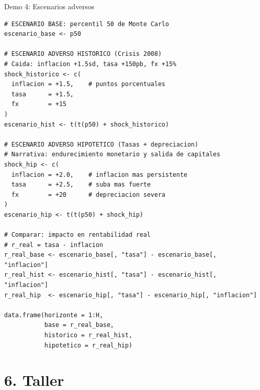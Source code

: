 \documentclass[10pt,aspectratio=169]{beamer}
\begin{document}
\begin{frame}[fragile]{Demo 4: Escenarios adversos}
\begin{lstlisting}
# ESCENARIO BASE: percentil 50 de Monte Carlo
escenario_base <- p50

# ESCENARIO ADVERSO HISTORICO (Crisis 2008)
# Caida: inflacion +1.5sd, tasa +150pb, fx +15%
shock_historico <- c(
  inflacion = +1.5,    # puntos porcentuales
  tasa      = +1.5,
  fx        = +15
)
escenario_hist <- t(t(p50) + shock_historico)

# ESCENARIO ADVERSO HIPOTETICO (Tasas + depreciacion)
# Narrativa: endurecimiento monetario y salida de capitales
shock_hip <- c(
  inflacion = +2.0,    # inflacion mas persistente
  tasa      = +2.5,    # suba mas fuerte
  fx        = +20      # depreciacion severa
)
escenario_hip <- t(t(p50) + shock_hip)

# Comparar: impacto en rentabilidad real
# r_real = tasa - inflacion
r_real_base <- escenario_base[, "tasa"] - escenario_base[, "inflacion"]
r_real_hist <- escenario_hist[, "tasa"] - escenario_hist[, "inflacion"]
r_real_hip  <- escenario_hip[, "tasa"] - escenario_hip[, "inflacion"]

data.frame(horizonte = 1:H,
           base = r_real_base,
           historico = r_real_hist,
           hipotetico = r_real_hip)
\end{lstlisting}
\end{frame}

\section{6. Taller}
\end{document}
